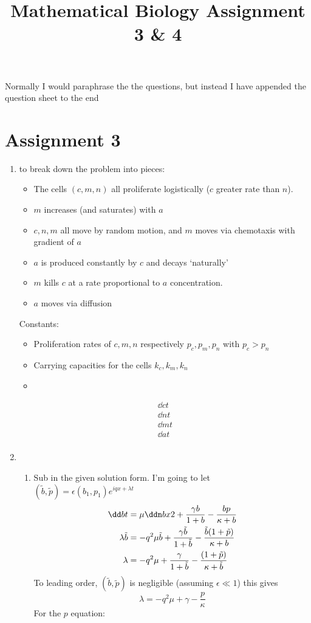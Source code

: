 \documentclass{X:/Documents/Coding/Latex/myassignment}
\title{Mathematical Biology Assignment 3 \& 4}
\begin{document}
\maketitle
Normally I would paraphrase the  the questions, but instead I have appended the question sheet to the end
\section{Assignment 3}
\begin{enumerate}
	\item to break down the problem into pieces:
	\begin{itemize}
		\item The cells $(c,m,n)$ all proliferate logistically ($c$ greater rate than $n$).
		\item $m$ increases (and saturates) with $a$
		\item $c,n,m$ all move by random motion, and $m$ moves via chemotaxis with gradient of $a$
		\item $a$ is produced constantly by $c$ and decays `naturally'
		\item $m$ kills $c$ at a rate proportional to $a$ concentration. 
		\item $a$ moves via diffusion
	\end{itemize}
	Constants:
	\begin{itemize}
		\item Proliferation rates of $c,m,n$ respectively $p_c,p_m,p_n$ with $p_c > p_n$
		\item Carrying capacities for the cells $k_c,k_m,k_n$
		\item 
	\end{itemize}
	\begin{align*}
		\dd ct\\
		\dd nt\\
		\dd mt\\
		\dd at\\
	\end{align*}
	\item 
	\begin{enumerate}
		\item Sub in the given solution form. I'm going to let $(\tilde{b}, \tilde{p}) = \epsilon(b_1,p_1)e^{iqx+\lambda t}$ 
		\begin{align*}
			\dd bt &= \mu \ddn bx2 + \frac{\gamma b}{1+ b} - \frac{b p }{\kappa + b}\\
			\lambda \tilde{b} &= -q^2 \mu \tilde{b} + \frac{\gamma \tilde{b}}{1 + \tilde{b}} - \frac{\tilde{b} (1 + \tilde{p})}{\kappa + b}\\
			\lambda &= -q^2 \mu + \frac{\gamma}{1 + \tilde{b}} - \frac{(1+\tilde{p})}{\kappa + \tilde{b}}\\
		\end{align*}
		To leading order, $(\tilde{b},\tilde{p})$ is negligible (assuming $\epsilon \ll 1$) this gives
		\[\lambda = -q^2 \mu + \gamma - \frac{p}{\kappa}\]
		For the $p$ equation:


\end{enumerate}
\end{enumerate}
\end{document}
